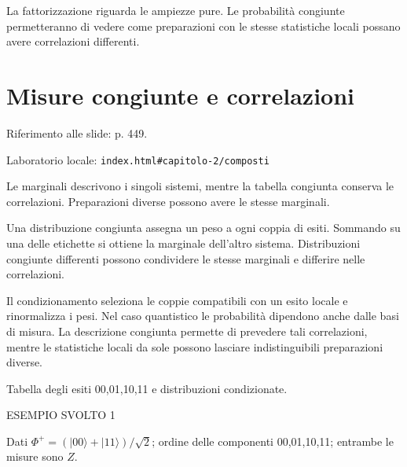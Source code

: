 La fattorizzazione riguarda le ampiezze pure. Le probabilità congiunte permetteranno di vedere come preparazioni con le stesse statistiche locali possano avere correlazioni differenti.\par


\Needspace{.43\textheight}
\section{Misure congiunte e correlazioni}
\label{c2-composti}

{\sffamily\small\color{Ink!70} Riferimento alle slide: p. 449.\par}

{\sffamily\small\color{Ink!70} Laboratorio locale: \nolinkurl{index.html#capitolo-2/composti}\par}

Le marginali descrivono i singoli sistemi, mentre la tabella congiunta conserva le correlazioni. Preparazioni diverse possono avere le stesse marginali.\par

Una distribuzione congiunta assegna un peso a ogni coppia di esiti. Sommando su una delle etichette si ottiene la marginale dell'altro sistema. Distribuzioni congiunte differenti possono condividere le stesse marginali e differire nelle correlazioni.\par

Il condizionamento seleziona le coppie compatibili con un esito locale e rinormalizza i pesi. Nel caso quantistico le probabilità dipendono anche dalle basi di misura. La descrizione congiunta permette di prevedere tali correlazioni, mentre le statistiche locali da sole possono lasciare indistinguibili preparazioni diverse.\par



Tabella degli esiti 00,01,10,11 e distribuzioni condizionate.\par


\Needspace{.36\textheight}\label{c2-composti-example-1}
{\sffamily\small\color{Accent} ESEMPIO SVOLTO 1\par}
Dati \(\Phi ^{+}=(|00\rangle +|11\rangle )/\sqrt{2}\); ordine delle componenti 00,01,10,11; entrambe le misure sono \(Z\).\par


